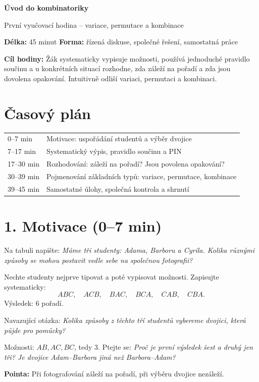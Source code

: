 \documentclass[10pt,a4paper]{article}
\newcommand{\cas}[1]{\textcolor{accent}{\bfseries #1}}
\newcommand{\otazka}[1]{\emph{#1}}
\begin{document}
{\LARGE\bfseries Úvod do kombinatoriky}\par
{\large První vyučovací hodina -- variace, permutace a kombinace}\par
\vspace{2mm}
\textbf{Délka:} 45 minut \quad \textbf{Forma:} řízená diskuse, společné řešení, samostatná práce

\textbf{Cíl hodiny:} Žák systematicky vypisuje možnosti, používá jednoduché pravidlo součinu a u konkrétních situací rozhodne, zda záleží na pořadí a zda jsou dovolena opakování. Intuitivně odliší variaci, permutaci a kombinaci.

\section*{Časový plán}
\begin{tabularx}{\textwidth}{@{}p{24mm}X@{}}\toprule
0--7 min & Motivace: uspořádání studentů a výběr dvojice \\
7--17 min & Systematický výpis, pravidlo součinu a PIN \\
17--30 min & Rozhodování: záleží na pořadí? Jsou povolena opakování? \\
30--39 min & Pojmenování základních typů: variace, permutace, kombinace \\
39--45 min & Samostatné úlohy, společná kontrola a shrnutí \\
\bottomrule\end{tabularx}

\section*{1. Motivace \texorpdfstring{\cas{(0--7 min)}}{(0--7 min)}}
Na tabuli napište: \otazka{Máme tři studenty: Adama, Barboru a Cyrila. Kolika různými způsoby se mohou postavit vedle sebe na společnou fotografii?}

Nechte studenty nejprve tipovat a poté vypisovat možnosti. Zapisujte systematicky:
\[
ABC,\quad ACB,\quad BAC,\quad BCA,\quad CAB,\quad CBA.
\]
Výsledek: \(6\) pořadí.

Navazující otázka: \otazka{Kolika způsoby z těchto tří studentů vybereme dvojici, která půjde pro pomůcky?}

Možnosti: \(AB, AC, BC\), tedy \(3\). Ptejte se: \otazka{Proč je první výsledek šest a druhý jen tři? Je dvojice Adam--Barbora jiná než Barbora--Adam?}

\textbf{Pointa:} Při fotografování záleží na pořadí, při výběru dvojice nezáleží.
\end{document}

